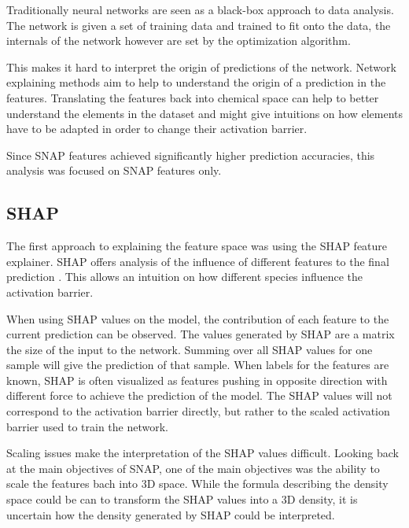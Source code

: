 Traditionally neural networks are seen as a black-box approach to data analysis.
The network is given a set of training data and trained to fit onto the data,
the internals of the network however are set by the optimization algorithm.

This makes it hard to interpret the origin of predictions of the network.
Network explaining methods aim to help to understand the origin of a prediction in the features.
Translating the features back into chemical space can help to better understand 
the elements in the dataset and might give intuitions on how elements have to be adapted in order to change their activation barrier.

Since SNAP features achieved significantly higher prediction accuracies,
this analysis was focused on SNAP features only.

\subsection{SHAP}

The first approach to explaining the feature space was using the SHAP feature explainer.
SHAP offers analysis of the influence of different features to the final prediction \cite{NIPS2017_7062}.
This allows an intuition on how different species influence the activation barrier.

When using SHAP values on the model, the contribution of each feature to the current prediction can be observed.
The values generated by SHAP are a matrix the size of the input to the network.
Summing over all SHAP values for one sample will give the prediction of that sample.
When labels for the features are  known, SHAP is often visualized as features pushing in opposite direction with different force 
to achieve the prediction of the model.
The SHAP values will not correspond to the activation barrier directly,
but rather to the scaled activation barrier used to train the network.

Scaling issues make the interpretation of the SHAP values difficult.
Looking back at the main objectives of SNAP, one of the main objectives was the ability to scale the features bach into 3D space.
While the formula describing the density space could be can to transform the SHAP values 
into a 3D density, it is uncertain how the density generated by SHAP could be interpreted.

